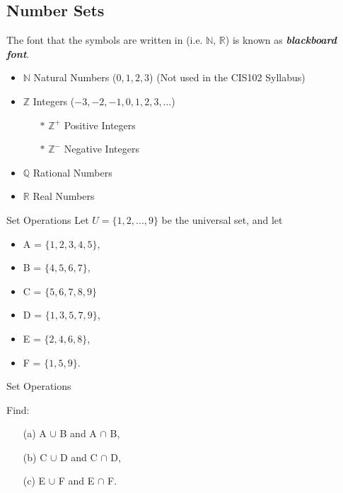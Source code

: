 \documentclass[11pt,a4paper,titlepage,oneside,openany]{article}
\numberwithin{equation}{section}
\numberwithin{algorithm}{section}
\numberwithin{figure}{section}
\numberwithin{table}{section}
\begin{document}
{%
\subsection{Number Sets}
The font that the symbols are written in (i.e. $\mathbb{N}$, $\mathbb{R}$) is known as \textit{\textbf{blackboard font}}.
\begin{itemize}
\item $\mathbb{N}$ Natural Numbers ($0,1,2,3$) 
(Not used in the CIS102 Syllabus)
\item $\mathbb{Z}$ Integers ($-3,-2,-1,0,1,2,3, \ldots$)
\begin{itemize}
\item[$\ast$] $\mathbb{Z}^{+}$ Positive Integers
\item[$\ast$] $\mathbb{Z}^{-}$ Negative Integers
\end{itemize}
\item $\mathbb{Q}$ Rational Numbers
\item $\mathbb{R}$ Real Numbers
\end{itemize}

\newpage



{Set Operations}
Let $U = \{1,2,\ldots, 9\}$ be the universal set, and let
\begin{itemize}
\item A = $\{1, 2, 3, 4, 5\}$,  
\item B = $\{4, 5, 6, 7\}$,  
\item C = $\{5, 6, 7, 8, 9\}$
\item D = $\{1, 3, 5, 7, 9\}$,
\item E = $\{2, 4, 6, 8\}$,
\item F = $\{1, 5, 9\}$.
\end{itemize}


{Set Operations}

Find: 
\begin{itemize}
\item[(a)] A $\cup$ B and A $\cap$ B, 
\item[(b)] C $\cup$ D and C $\cap$ D, 
\item[(c)] E $\cup$ F and E $\cap$ F.
\end{itemize}


}
\end{document}
